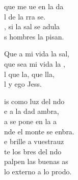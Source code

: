 \begin{cancion}%
	 que me ue en la da\\
	l de la rra se.\\
	, si la sal se adula\\
	s hombres la pisan.\jump\\
	\begin{chorus}%
		Que a mi vida la sal,\\
		que sea mi vida la ,\\
		l que la,  que lla,\\
		l y ego Jess.\jump\\
	\end{chorus}%
	is como luz del ndo\\
	e a la dad ambra,\\
	a se pone en la a\\
	nde el monte se enbra.\\
	\jump
	e brille a vuestrauz\\
	te los bres del ndo\\
	 palpen las buenas as\\
	 lo externo a lo prodo.\\
\end{cancion}%
